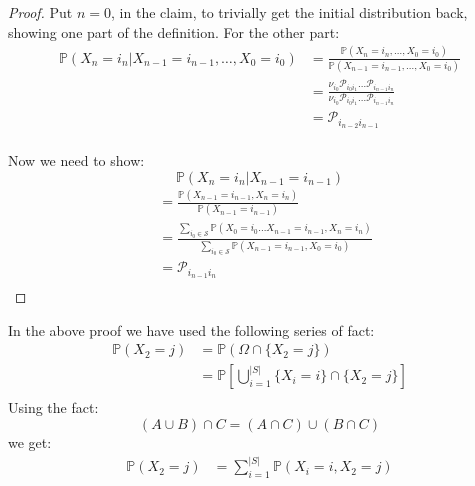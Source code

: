 \begin{proof}
    Put \(n=0\), in the claim, to trivially get the initial distribution back, showing one part of the definition.
    For the other part:
    \[
    \begin{aligned}    
        \mathbb{P}(X_{n} = i_{n} | X_{n-1} = i_{n-1}, \dots, X_{0} = i_{0}) &=
         \frac{\mathbb{P}(X_{n} = i_{n}, \dots, X_{0} = i_{0})}
         {\mathbb{P}(X_{n-1} = i_{n-1}, \dots, X_{0} = i_{0})} \\
         &= \frac{\nu _{i_0} \mathcal{P} _{i_0 i_1} \dots \mathcal{P} _{i_{n-1} i_n}}
         {\nu _{i_0} \mathcal{P} _{i_0 i_1} \dots \mathcal{P} _{i_{n-1} i_n}} \\
            &= \mathcal{P} _{i_{n-2} i_{n-1} } \\
    \end{aligned}
    \]

    Now we need to show:
    \[
        \mathbb{P}(X_{n} = i_{n} | X_{n-1} = i_{n-1})
    \]
    \[
        \begin{aligned}
            & = \frac{\mathbb{P}(X_{n-1} = i_{n-1}, X_{n} = i_{n})}{\mathbb{P}(X_{n-1} = i_{n-1})} \\
            & = \frac{\sum_{i_0 \in \mathcal{S} } \mathbb{P}(X_0 = i_0 \dots  X_{n-1} = i_{n-1}, X_{n} = i_{n})}
            {\sum_{i_0 \in \mathcal{S} } \mathbb{P}(X_{n-1} = i_{n-1}, X_{0} = i_{0})} \\
            & = \mathcal{P} _{i_{n-1} i_n} \\
        \end{aligned}
    \]
\end{proof}\vspace{1em}
In the above proof we have used the following series of fact:
\[
    \begin{aligned}
        \mathbb{P} (X_2 = j) & = \mathbb{P}(\Omega \cap \{X_2 = j\})\\
        &= \mathbb{P} \left[ 
            \bigcup_{i=1}^{ |S| } \{X_i = i\} \cap \{X_2 = j\}
         \right] \\
    \end{aligned}
\]
Using the fact:
\[
    (A \cup B) \cap C = (A \cap C ) \cup (B \cap C)
\]
we get:
\[
    \begin{aligned}
        \mathbb{P} (X_2 = j) & = \sum\limits_{i = 1}^{ |S| } 
        \mathbb{P} \left(
             X_i = i, X_2 = j
         \right)
    \end{aligned}
\]

